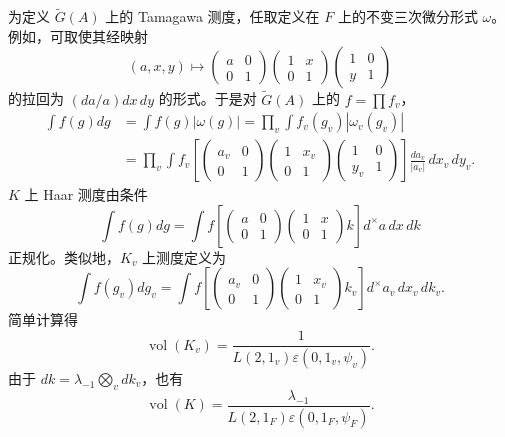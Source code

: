 为定义 $\widetilde G(A)$ 上的 Tamagawa 测度，任取定义在 $F$ 上的不变三次微分形式
$\omega$。例如，可取使其经映射
\[
 (a,x,y)\longmapsto\begin{pmatrix}a&0\\0&1\end{pmatrix}
 \begin{pmatrix}1&x\\0&1\end{pmatrix}\begin{pmatrix}1&0\\y&1\end{pmatrix}
\]
的拉回为 $(da/a)dx\,dy$ 的形式。于是对 $\widetilde G(A)$ 上的 $f=\prod f_v$，
\begin{equation}
\begin{split}
 \int f(g)dg&=\int f(g)|\omega(g)|=\prod_v\int f_v(g_v)|\omega_v(g_v)|\\
 &=\prod_v\int f_v\!\left[\begin{pmatrix}a_v&0\\0&1\end{pmatrix}
 \begin{pmatrix}1&x_v\\0&1\end{pmatrix}\begin{pmatrix}1&0\\y_v&1\end{pmatrix}\right]
 \frac{da_v}{|a_v|}\,dx_v\,dy_v.
\end{split}\tag{7.4}
\end{equation}
$K$ 上 Haar 测度由条件
\begin{equation}
 \int f(g)dg=\int f\!\left[\begin{pmatrix}a&0\\0&1\end{pmatrix}
 \begin{pmatrix}1&x\\0&1\end{pmatrix}k\right]d^\times a\,dx\,dk\tag{7.5}
\end{equation}
正规化。类似地，$K_v$ 上测度定义为
\begin{equation}
 \int f(g_v)dg_v=\int f\!\left[\begin{pmatrix}a_v&0\\0&1\end{pmatrix}
 \begin{pmatrix}1&x_v\\0&1\end{pmatrix}k_v\right]d^\times a_v\,dx_v\,dk_v.\tag{7.6}
\end{equation}
简单计算得
\begin{equation}
 \operatorname{vol}(K_v)=\frac1{L(2,1_v)\varepsilon(0,1_v,\psi_v)}.\tag{7.7}
\end{equation}
由于 $dk=\lambda_{-1}\bigotimes_vdk_v$，也有
\begin{equation}
 \operatorname{vol}(K)=\frac{\lambda_{-1}}{L(2,1_F)\varepsilon(0,1_F,\psi_F)}.\tag{7.8}
\end{equation}

